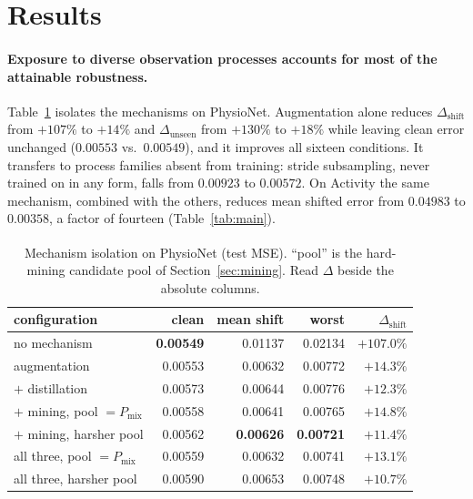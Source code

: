 \documentclass[sigconf,nonacm]{acmart}
\newcommand{\prelim}{\textsuperscript{\dag}}
\begin{document}
\section{Results}
\label{sec:results}

\paragraph{Exposure to diverse observation processes accounts for most of the attainable robustness.}
Table~\ref{tab:components} isolates the mechanisms on PhysioNet. Augmentation alone reduces
$\Delta_{\mathrm{shift}}$ from $+107\%$ to $+14\%$ and $\Delta_{\mathrm{unseen}}$ from $+130\%$ to $+18\%$ while
leaving clean error unchanged ($0.00553$ vs.\ $0.00549$), and it improves all sixteen conditions. It transfers to
process families absent from training: stride subsampling, never trained on in any form, falls from $0.00923$ to
$0.00572$. On Activity the same mechanism, combined with the others, reduces mean shifted error from $0.04983$ to
$0.00358$, a factor of fourteen (Table~\ref{tab:main}).

\begin{table}[t]
\caption{Mechanism isolation on PhysioNet (test MSE\prelim). ``pool'' is the hard-mining candidate pool of
Section~\ref{sec:mining}. Read $\Delta$ beside the absolute columns.}
\label{tab:components}
\small
\begin{tabular}{lrrrr}
\toprule
configuration & clean & mean shift & worst & $\Delta_{\mathrm{shift}}$ \\
\midrule
no mechanism & \textbf{0.00549} & 0.01137 & 0.02134 & $+107.0\%$ \\
augmentation & 0.00553 & 0.00632 & 0.00772 & $+14.3\%$ \\
\quad $+$ distillation & 0.00573 & 0.00644 & 0.00776 & $+12.3\%$ \\
\quad $+$ mining, pool $=P_{\mathrm{mix}}$ & 0.00558 & 0.00641 & 0.00765 & $+14.8\%$ \\
\quad $+$ mining, harsher pool & 0.00562 & \textbf{0.00626} & \textbf{0.00721} & $+11.4\%$ \\
all three, pool $=P_{\mathrm{mix}}$ & 0.00559 & 0.00632 & 0.00741 & $+13.1\%$ \\
all three, harsher pool & 0.00590 & 0.00653 & 0.00748 & $\mathbf{+10.7\%}$ \\
\bottomrule
\end{tabular}
\end{table}
\end{document}
